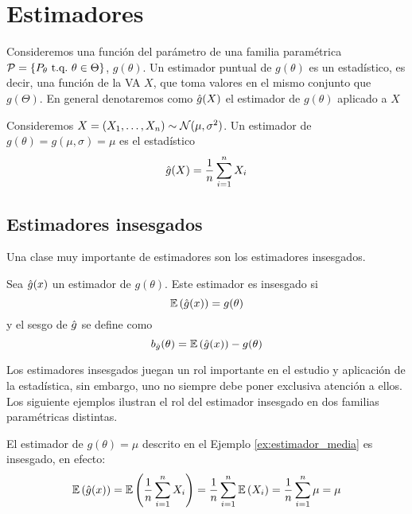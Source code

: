 

\chapter{Estimadores}

Consideremos una función del parámetro de una familia paramétrica $\mathcal{P} = \{P_\theta\ {\text{t.q.}}\ \theta\in\Theta\}$, $g(\theta)$.  Un estimador puntual de $g(\theta)$ es un estadístico, es decir, una función de la VA $X$, que toma valores en el mismo conjunto que $g(\Theta)$. En general denotaremos como ${ \hat{g}}(X)$ el estimador de $g(\theta)$ aplicado a $X$ 


\begin{example}
	\label{ex:estimador_media}
	Consideremos $X = (X_1,\ldots,X_n)\sim{\mathcal N}(\mu,\sigma^2)$. Un estimador de $g(\theta) = g(\mu,\sigma) = \mu$ es el estadístico 
	\begin{equation}
		{ \hat{g}}(X) = \frac{1}{n}\sum_{i=1}^nX_i
	\end{equation} 
\end{example}

\section{Estimadores insesgados} 
Una clase muy importante de estimadores son los estimadores insesgados. 

\begin{definition}
	\label{def:estimador_insesgado}
	Sea ${ \hat{g}(x)}$ un estimador de $g(\theta)$. Este estimador es insesgado si 
	\begin{equation}
		\mathbb{E} \left({ \hat{g}(x)}\right) = g(\theta)
	\end{equation}
	y el sesgo de ${ \hat{g}}$ se define como 
	\begin{equation}
		b_{ \hat{g}}(\theta) = \mathbb{E} \left({ \hat{g}(x)}\right) - g(\theta)
	\end{equation}
\end{definition}



Los estimadores insesgados juegan un rol importante en el estudio y aplicación de la estadística, sin embargo, uno no siempre debe poner exclusiva atención a ellos. Los siguiente ejemplos ilustran el rol del estimador insesgado en dos familias paramétricas distintas. 

\begin{example}
	\label{ex:estimador_in_media}
	El estimador de $g(\theta) =  \mu$ descrito en el Ejemplo \ref{ex:estimador_media} es insesgado, en efecto: 
	\begin{equation}
		\mathbb{E} \left({ \hat{g}(x)}\right) = \mathbb{E} \left(\frac{1}{n}\sum_{i=1}^nX_i\right)	= \frac{1}{n}\sum_{i=1}^n\mathbb{E} \left(X_i\right)		= \frac{1}{n}\sum_{i=1}^n\mu = \mu	
	\end{equation}
\end{example}


